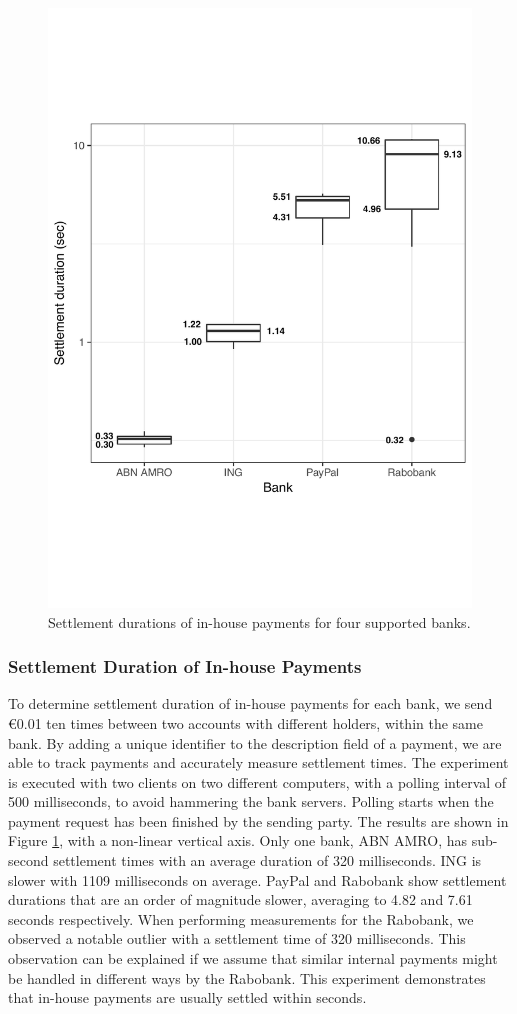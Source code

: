\begin{figure}[t]
	\centering
	\includegraphics[width=.7\linewidth]{iom/assets/intrabank_annotated}
	\caption{Settlement durations of in-house payments for four supported banks.}
	\label{fig:intrabank_speed}
\end{figure}

\subsubsection*{Settlement Duration of In-house Payments}
\label{sec:settlement_inhouse_experiment}
To determine settlement duration of in-house payments for each bank, we send \euro 0.01 ten times between two accounts with different holders, within the same bank.
By adding a unique identifier to the description field of a payment, we are able to track payments and accurately measure settlement times.
The experiment is executed with two clients on two different computers, with a polling interval of 500 milliseconds, to avoid hammering the bank servers.
Polling starts when the payment request has been finished by the sending party.
The results are shown in Figure \ref{fig:intrabank_speed}, with a non-linear vertical axis.
Only one bank, ABN AMRO, has sub-second settlement times with an average duration of 320 milliseconds.
ING is slower with 1109 milliseconds on average.
PayPal and Rabobank show settlement durations that are an order of magnitude slower, averaging to 4.82 and 7.61 seconds respectively.
When performing measurements for the Rabobank, we observed a notable outlier with a settlement time of 320 milliseconds.
This observation can be explained if we assume that similar internal payments might be handled in different ways by the Rabobank.
This experiment demonstrates that in-house payments are usually settled within seconds.

